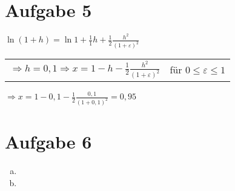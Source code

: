 \documentclass[11pt,a4paper]{article}
\begin{document}
	\section*{Aufgabe 5}
		$\ln \left( 1 + h \right) = \ln 1 + \frac{1}{1}h + \frac{1}{2}\frac{h^2}{\left( 1 + \varepsilon \right)^2}$\\
		\begin{tabular}{lr}
			$\Rightarrow h = 0,1 \Rightarrow x = 1 - h - \frac{1}{2} \frac{h^2}{\left( 1+ \varepsilon \right)^2}$&für $0 \leq \varepsilon \leq 1$\\
		\end{tabular}
		$\Rightarrow x = 1 - 0,1 - \frac{1}{2} \frac{0,1}{\left( 1 + 0,1\right)^2} = 0,95$
	\section*{Aufgabe 6}
		\begin{enumerate}[a)]
			\item
			
			\item
		\end{enumerate}
\end{document}
